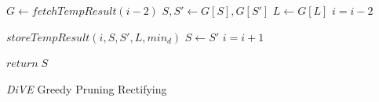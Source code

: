 \documentclass{article}
\begin{document}
\begin{algorithm}
{{			%
			
			$ G \leftarrow fetchTempResult(i- 2)$\;
			$ S, S' \leftarrow G[S], G[S'] $ \;
			$ L \leftarrow G[L] $ \;
			$i = i- 2  $\;
			
			
			
		}{
			$ storeTempResult(i, S, S', L, min_d)$\;
			$ S \leftarrow S' $ \;
			$i = i + 1  $\;
		}
		
		
		
		
		
		
		
		
		
	}
	$return\; S$
	\caption{\textit{DiVE} Greedy Pruning Rectifying}\label{DiVE-Greedy-Pruning-Rectifying}
\end{algorithm}


\end{document}
